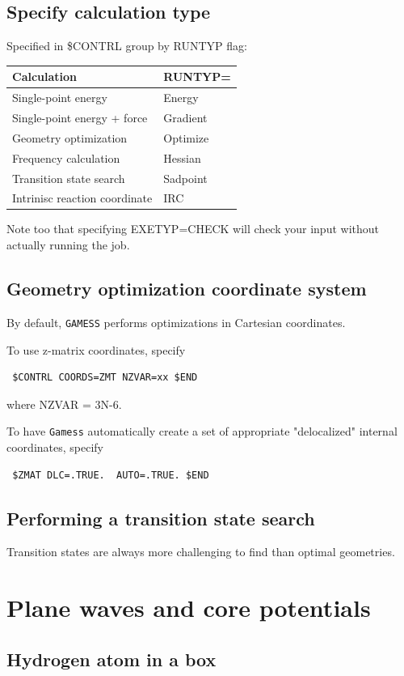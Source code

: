 \documentclass[11pt]{article}
\begin{document}
\subsection{Specify calculation type}
\label{sec-7-5}
Specified in \$CONTRL group by RUNTYP flag:

\begin{center}
\begin{tabular}{ll}
Calculation & RUNTYP=\\
\hline
Single-point energy & Energy\\
Single-point energy + force & Gradient\\
Geometry optimization & Optimize\\
Frequency calculation & Hessian\\
Transition state search & Sadpoint\\
Intrinisc reaction coordinate & IRC\\
\end{tabular}
\end{center}

Note too that specifying EXETYP=CHECK will check your input without actually running the job.
\subsection{Geometry optimization coordinate system}
\label{sec-7-6}
By default, \texttt{GAMESS} performs optimizations in Cartesian coordinates.

To use z-matrix coordinates, specify
\begin{verbatim}
 $CONTRL COORDS=ZMT NZVAR=xx $END
\end{verbatim}
where NZVAR = 3N-6.

To have \texttt{Gamess} automatically create a set of appropriate "delocalized" internal coordinates, specify
\begin{verbatim}
 $ZMAT DLC=.TRUE.  AUTO=.TRUE. $END
\end{verbatim}
\subsection{Performing a transition state search}
\label{sec-7-7}
Transition states are always more challenging to find than optimal geometries.
\section{Plane waves and core potentials}
\label{sec-8}

\subsection{Hydrogen atom in a box}
\label{sec-8-1}
\end{document}
